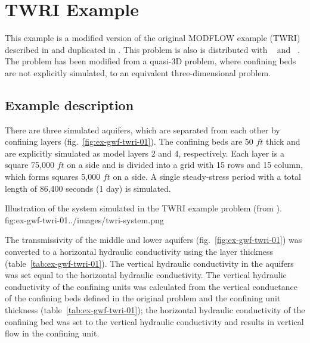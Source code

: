 \section{TWRI Example}

This example is a modified version of the original MODFLOW example (TWRI) described in \cite{modflow88} and duplicated in \cite{harbaugh1996user}. This problem is also is distributed with \mff~\citep{modflow2005} and \mf~\citep{modflow6software}. The problem has been modified from a quasi-3D problem, where confining beds are not explicitly simulated, to an equivalent three-dimensional problem.

\subsection{Example description}
There are three simulated aquifers, which are separated from each other by confining layers (fig.~\ref{fig:ex-gwf-twri-01}). The confining beds are 50 $ft$ thick and are explicitly simulated as model layers 2 and 4, respectively. Each layer is a square 75,000 $ft$ on a side and is divided into a grid with 15 rows and 15 column, which forms squares 5,000 $ft$ on a side. A single steady-stress period with a total length of 86,400 seconds (1 day) is simulated.

\begin{StandardFigure}{
                                     Illustration of the system simulated in the TWRI example problem (from \cite{modflow88}).
                                     }{fig:ex-gwf-twri-01}{../images/twri-system.png}
\end{StandardFigure}                                 

The transmissivity of the middle and lower aquifers (fig.~\ref{fig:ex-gwf-twri-01}) was converted to a horizontal hydraulic conductivity using the layer thickness (table~\ref{tab:ex-gwf-twri-01}). The vertical hydraulic conductivity in the aquifers was set equal to the horizontal hydraulic conductivity. The vertical hydraulic conductivity of the confining units was calculated from the vertical conductance of the confining beds defined in the original problem and the confining unit thickness (table~\ref{tab:ex-gwf-twri-01}); the horizontal hydraulic conductivity of the confining bed was set to the vertical hydraulic conductivity and results in vertical flow in the confining unit.

